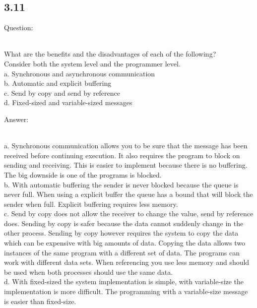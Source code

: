 \documentclass[]{article}
\begin{document}
\subsection*{3.11}
\begin{bfseries} Question: \end{bfseries}\\
What are the benefits and the disadvantages of each of the following?\\
Consider both the system level and the programmer level.\\
a. Synchronous and asynchronous communication\\
b. Automatic and explicit buffering\\
c. Send by copy and send by reference\\
d. Fixed-sized and variable-sized messages\\
\begin{bfseries} Answer: \end{bfseries}\\

a. Synchronous communication allows you to be sure that the message has been received before continuing execution. It also requires the program to block on sending and receiving. This is easier to implement because there is no buffering. The big downside is one of the programs is blocked.\\

b. With automatic buffering the sender is never blocked because the queue is never full. When using a explicit buffer the queue has a bound that will block the sender when full. Explicit buffering requires less memory.\\

c. Send by copy does not allow the receiver to change the value, send by reference does. Sending by copy is safer because the data cannot suddenly change in the other process. Sending by copy however requires the system to copy the data which can be expensive with big amounts of data. Copying the data allows two instances of the same program with a different set of data. The programs can work with different data sets. When referencing you use less memory and should be used when both processes should use the same data.\\

d. With fixed-sized the system implementation is simple, with variable-size the implementation is more difficult. The programming with a variable-size message is easier than fixed-size.\\
\end{document}
